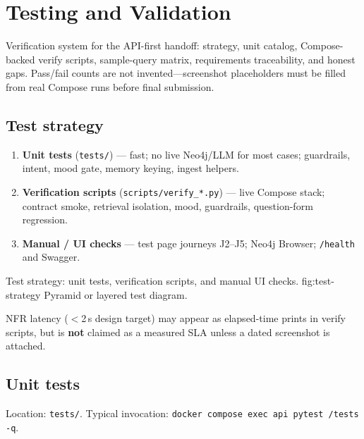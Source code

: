 \chapter{Testing and Validation}
\label{ch:testing}

Verification system for the API-first handoff: strategy, unit catalog, Compose-backed verify scripts, sample-query matrix, requirements traceability, and honest gaps. Pass/fail counts are not invented---screenshot placeholders must be filled from real Compose runs before final submission.

\section{Test strategy}

\begin{enumerate}[leftmargin=*]
  \item \textbf{Unit tests} (\texttt{tests/}) --- fast; no live Neo4j/LLM for most cases; guardrails, intent, mood gate, memory keying, ingest helpers.
  \item \textbf{Verification scripts} (\texttt{scripts/verify\_*.py}) --- live Compose stack; contract smoke, retrieval isolation, mood, guardrails, question-form regression.
  \item \textbf{Manual / UI checks} --- test page journeys J2--J5; Neo4j Browser; \texttt{/health} and Swagger.
\end{enumerate}

%
{Test strategy: unit tests, verification scripts, and manual UI checks.}%
{fig:test-strategy}%
{Pyramid or layered test diagram.}

\noindent
NFR latency ($<$2\,s design target) may appear as elapsed-time prints in verify scripts, but is \textbf{not} claimed as a measured SLA unless a dated screenshot is attached.

\section{Unit tests}

Location: \texttt{tests/}. Typical invocation: \texttt{docker compose exec api pytest /tests -q}.

